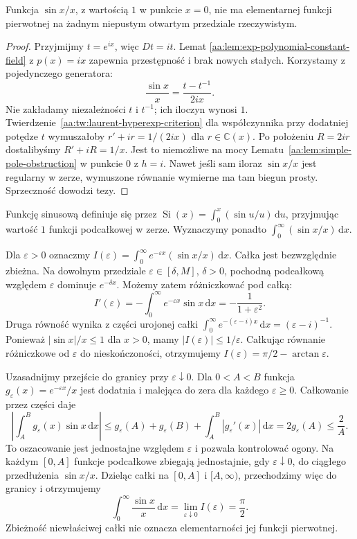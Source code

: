\begin{twierdzenie}
\label{aa:tw:sine-integral-nonelementary}
Funkcja $\sin x/x$, z wartością $1$
w punkcie $x=0$, nie ma elementarnej
funkcji pierwotnej na żadnym
niepustym otwartym przedziale rzeczywistym.
\end{twierdzenie}
\begin{proof}
Przyjmijmy $t=e^{ix}$, więc
$Dt=it$. Lemat
\ref{aa:lem:exp-polynomial-constant-field}
z $p(x)=ix$ zapewnia przestępność
i brak nowych stałych.
Korzystamy z pojedynczego generatora:
\[
 \frac{\sin x}{x}
 =\frac{t-t^{-1}}{2ix}.
\]
Nie zakładamy niezależności
$t$ i $t^{-1}$; ich iloczyn wynosi $1$.
Twierdzenie~\ref{aa:tw:laurent-hyperexp-criterion}
dla współczynnika przy dodatniej
potędze $t$ wymuszałoby
$r'+ir=1/(2ix)$ dla
$r\in\mathbb C(x)$.
Po położeniu $R=2ir$
dostalibyśmy $R'+iR=1/x$.
Jest to niemożliwe na mocy
Lematu~\ref{aa:lem:simple-pole-obstruction}
w punkcie $0$ z $h=i$.
Nawet jeśli sam iloraz $\sin x/x$
jest regularny w zerze, wymuszone
równanie wymierne ma tam biegun prosty.
Sprzeczność dowodzi tezy.
\end{proof}

\begin{przyklad}
\label{aa:prz:sine-integral-dirichlet}
Funkcję sinusową definiuje się przez
$\operatorname{Si}(x)=
\int_0^x (\sin u/u)\,\mathrm du$,
przyjmując wartość $1$ funkcji podcałkowej
w zerze. Wyznaczymy ponadto
$\int_0^\infty(\sin x/x)\,\mathrm dx$.

Dla $\varepsilon>0$ oznaczmy
$I(\varepsilon)=\int_0^\infty
e^{-\varepsilon x}(\sin x/x)\,\mathrm dx$.
Całka jest bezwzględnie zbieżna.
Na dowolnym przedziale
$\varepsilon\in[\delta,M]$,
$\delta>0$, pochodną podcałkową
względem $\varepsilon$
dominuje $e^{-\delta x}$.
Możemy zatem różniczkować pod całką:
\[
 I'(\varepsilon)
 =-\int_0^\infty e^{-\varepsilon x}\sin x\,\mathrm dx
 =-\frac1{1+\varepsilon^2}.
\]
Druga równość wynika z części urojonej
całki $\int_0^\infty e^{-(\varepsilon-i)x}
\,\mathrm dx=(\varepsilon-i)^{-1}$.
Ponieważ $|\sin x|/x\le1$ dla $x>0$,
mamy $|I(\varepsilon)|\le1/\varepsilon$.
Całkując równanie różniczkowe
od $\varepsilon$ do nieskończoności, otrzymujemy
$I(\varepsilon)=\pi/2-\arctan\varepsilon$.

Uzasadnijmy przejście do granicy przy
$\varepsilon\downarrow0$. Dla $0<A<B$
funkcja $g_\varepsilon(x)=e^{-\varepsilon x}/x$
jest dodatnia i malejąca do zera dla
każdego $\varepsilon\ge0$.
Całkowanie przez części daje
\[
 \left|\int_A^B g_\varepsilon(x)\sin x\,\mathrm dx\right|
 \le g_\varepsilon(A)+g_\varepsilon(B)
       +\int_A^B|g_\varepsilon'(x)|\,\mathrm dx
 =2g_\varepsilon(A)\le\frac2A.
\]
To oszacowanie jest jednostajne względem
$\varepsilon$ i pozwala kontrolować ogony.
Na każdym $[0,A]$ funkcje podcałkowe
zbiegają jednostajnie, gdy
$\varepsilon\downarrow0$, do
ciągłego przedłużenia $\sin x/x$.
Dzieląc całki na $[0,A]$ i $[A,\infty)$,
przechodzimy więc do granicy i otrzymujemy
\[
 \int_0^\infty\frac{\sin x}{x}\,\mathrm dx
 =\lim_{\varepsilon\downarrow0}I(\varepsilon)
 =\frac{\pi}{2}.
\]
Zbieżność niewłaściwej całki nie oznacza
elementarności jej funkcji pierwotnej.
\end{przyklad}

